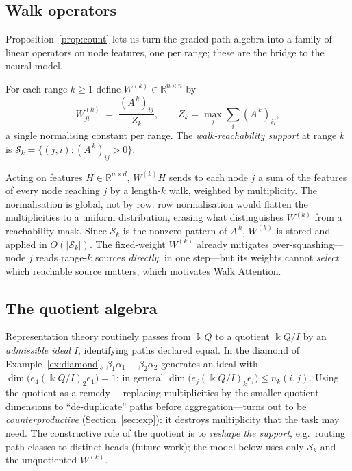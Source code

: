 \documentclass[runningheads]{llncs}
\newcommand{\kk}{\Bbbk}
\newcommand{\kQ}{\kk Q}
\newcommand{\RR}{\mathbb{R}}
\newcommand{\Adj}{A}
\begin{document}
\subsection{Walk operators}

Proposition~\ref{prop:count} lets us turn the graded path algebra into a family
of linear operators on node features, one per range; these are the bridge to
the neural model.

\begin{definition}\label{def:walkop}
For each range $k\ge1$ define $W^{(k)}\in\RR^{n\times n}$ by
\[
  W^{(k)}_{j i}\;=\;\frac{(\Adj^{\,k})_{ij}}{\,Z_k\,},
  \qquad Z_k=\max_{j}\sum_i (\Adj^{\,k})_{ij},
\]
a single normalising constant per range. The \emph{walk-reachability support}
at range $k$ is $\mathcal{S}_k=\{(j,i):(\Adj^{\,k})_{ij}>0\}$.
\end{definition}

Acting on features $H\in\RR^{n\times d}$, $W^{(k)}H$ sends to each node $j$
a sum of the features of every node reaching $j$ by a length-$k$ walk,
weighted by multiplicity. The normalisation is global, not by row: row
normalisation would flatten the multiplicities to a uniform distribution,
erasing what distinguishes $W^{(k)}$ from a reachability mask. Since
$\mathcal{S}_k$ is the nonzero pattern of $\Adj^{\,k}$, $W^{(k)}$ is stored
and applied in $O(|\mathcal{S}_k|)$. The fixed-weight $W^{(k)}$ already
mitigates over-squashing---node $j$ reads range-$k$ sources \emph{directly},
in one step---but its weights cannot \emph{select} which reachable source
matters, which motivates Walk Attention.

\subsection{The quotient algebra}

Representation theory routinely passes from $\kQ$ to a quotient $\kQ/I$ by an
\emph{admissible ideal} $I$, identifying paths declared equal. In the diamond
of Example~\ref{ex:diamond}, $\beta_1\alpha_1\equiv\beta_2\alpha_2$ generates
an ideal with $\dim\bigl(e_4(\kQ/I)_2e_1\bigr)=1$; in general
$\dim\bigl(e_j(\kQ/I)_ke_i\bigr)\le n_k(i,j)$. Using the quotient as a remedy
---replacing multiplicities by the smaller quotient dimensions to
``de-duplicate'' paths before aggregation---turns out to be
\emph{counterproductive} (Section~\ref{sec:exp}): it destroys multiplicity
that the task may need. The constructive role of the quotient is to
\emph{reshape the support}, e.g.\ routing path classes to distinct heads
(future work); the model below uses only $\mathcal{S}_k$ and the unquotiented
$W^{(k)}$.
\end{document}

